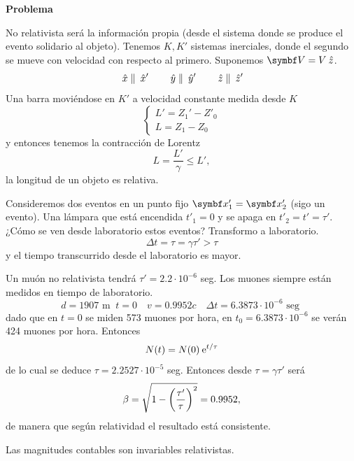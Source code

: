 \documentclass[10pt,oneside]{CBFT_book}
\begin{document}
\begin{ejemplo}{\bf Problema}
 
No relativista será la información propia (desde el sistema donde se produce el evento solidario
al objeto). Tenemos $K, K'$ sistemas inerciales, donde el segundo se mueve con velocidad 
con respecto al primero. Suponemos $\vb{V} = V\zver$.
\[
	\:\hat{x} \parallel \:\hat{x}' \qquad 
	\:\hat{y} \parallel \:\hat{y}' \qquad 
	\:\hat{z} \parallel \:\hat{z}'
\]
Una barra moviéndose en $K'$ a velocidad constante medida desde $K$
\[
	\begin{cases}
		L'= Z_1'- Z'_0 \\
		L= Z_1- Z_0
	\end{cases}
\]
y entonces tenemos la contracción de Lorentz
\[
	L = \frac{L'}{\gamma} \leq L',
\]
la longitud de un objeto es relativa.

Consideremos dos eventos en un punto fijo $\vb{x}'_1 = \vb{x}'_2$ (sigo un evento).
Una lámpara que está encendida $t'_1=0$ y se apaga en $t'_2=t'=\tau'$.
¿Cómo se ven desde laboratorio estos eventos? Transformo a laboratorio.
\[
	\Delta t = \tau =  \gamma \tau'> \tau
\]
y el tiempo transcurrido desde el laboratorio es mayor.

Un muón no relativista tendrá $\tau'= 2.2 \cdot 10^{-6}$ seg. Los muones siempre
están medidos en tiempo de laboratorio.
\[
	d = 1907 \text{ m } \: t=0 \quad 
	v = 0.9952 c \quad 
	\Delta t = 6.3873 \cdot 10^{-6} \text{ seg }
\]
dado que en $t=0$ se miden 573 muones por hora, en $t_0 = 6.3873 \cdot 10^{-6}$ se verán 
424 muones por hora.
Entonces
\[
	N(t) = N(0) \:\mathrm{e}^{t/\tau}
\]
de lo cual se deduce $\tau = 2.2527 \cdot 10^{-5}$ seg.
Entonces desde $\tau = \gamma \tau'$ será 
\[
	\beta = \sqrt{ 1 - \left( \frac{ \tau' }{ \tau } \right)^2 } = 0.9952,
\]
de manera que según relatividad el resultado está consistente.

Las magnitudes contables son invariables relativistas.

 
\end{ejemplo}
\end{document}
